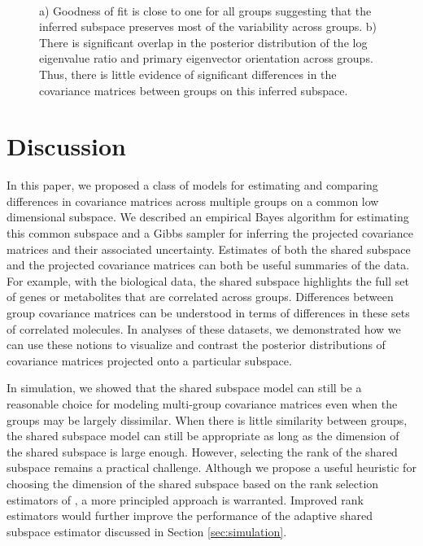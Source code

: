 \documentclass{statsoc}
\begin{document}
\begin{figure}[t]
    \centering
    ~ %
    \caption{a) Goodness of fit is close to one for all groups
      suggesting that the inferred subspace preserves most of the
      variability across groups. b) There is significant overlap in
      the posterior distribution of the log eigenvalue ratio and primary
      eigenvector orientation across groups. Thus, there is little
      evidence of significant differences in the covariance matrices
      between groups on this inferred subspace.  }
\end{figure}

\section{Discussion}

In this paper, we proposed a class of models for estimating and
comparing differences in covariance matrices across multiple groups on
a common low dimensional subspace.  We described an empirical Bayes
algorithm for estimating this common subspace and a Gibbs sampler for
inferring the projected covariance matrices and their associated
uncertainty.  Estimates of both the shared subspace and the projected
covariance matrices can both be useful summaries of the data.  For
example, with the biological data, the shared subspace highlights the
full set of genes or metabolites that are correlated across groups.
Differences between group covariance matrices can be understood in
terms of differences in these sets of correlated molecules.  In
analyses of these datasets, we demonstrated how
we can use these notions to visualize and contrast the posterior
distributions of covariance matrices projected onto a particular
subspace.

In simulation, we showed that the shared subspace model can still be a
reasonable choice for modeling multi-group covariance matrices even
when the groups may be largely dissimilar.  When there is little
similarity between groups, the shared subspace model can still be appropriate as
long as the dimension of the shared subspace is large enough.
However, selecting the rank of the shared subspace remains a practical
challenge.  Although we propose a useful heuristic for choosing the
dimension of the shared subspace based on the rank selection
estimators of \citet{Gavish2014}, a more principled approach is
warranted.  Improved rank estimators would further improve the
performance of the adaptive shared subspace estimator discussed in
Section \ref{sec:simulation}.
\end{document}
